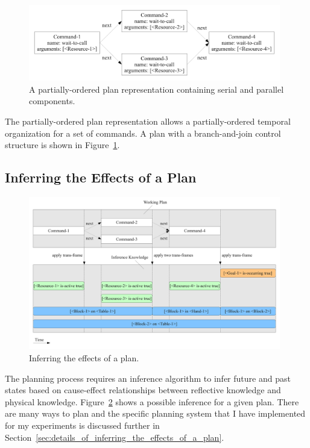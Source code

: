 \begin{figure}[bth]
  \center
  \includegraphics[width=11cm]{gfx/serial_and_parallel_plan}
  \caption[A partially-ordered plan with serial and parallel
    components]{A partially-ordered plan representation containing
    serial and parallel components.}
  \label{fig:serial_and_parallel_plan}
\end{figure}

The partially-ordered plan representation allows a partially-ordered
temporal organization for a set of commands.  A plan with a
branch-and-join control structure is shown in
Figure~\ref{fig:serial_and_parallel_plan}.


\subsection{Inferring the Effects of a Plan}
\label{sec:inferring_the_effects_of_a_plan}

\begin{figure}[bth]
  \center
  \includegraphics[width=11cm]{gfx/infer_plan_effects}
  \caption[Inferring the effects of a plan]{Inferring the effects of
    a plan.}
  \label{fig:infer_plan_effects}
\end{figure}

The planning process requires an inference algorithm to infer future
and past states based on cause-effect relationships between reflective
knowledge and physical knowledge.  Figure~\ref{fig:infer_plan_effects}
shows a possible inference for a given plan.  There are many ways to
plan and the specific planning system that I have implemented for my
experiments is discussed further in
Section~\ref{sec:details_of_inferring_the_effects_of_a_plan}.


